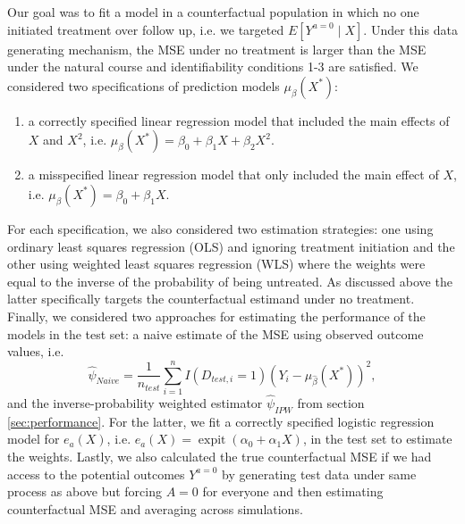 Our goal was to fit a model in a counterfactual population in which no one initiated treatment over follow up, i.e. we targeted $E[Y^{a=0} \mid X]$. Under this data generating mechanism, the MSE under no treatment is larger than the MSE under the natural course and identifiability conditions 1-3 are satisfied. We considered two specifications of prediction models $\mu_{\beta}(X^*)$:
\begin{enumerate}
    \item a correctly specified linear regression model that included the main effects of $X$ and $X^2$, i.e. $\mu_{\beta}(X^*) = \beta_0 + \beta_1 X + \beta_2 X^2$.
    \item a misspecified linear regression model that only included the main effect of $X$, i.e. $\mu_{\beta}(X^*) = \beta_0 + \beta_1 X$.
\end{enumerate} 
For each specification, we also considered two estimation strategies: one using ordinary least squares regression (OLS) and ignoring treatment initiation and the other using weighted least squares regression (WLS) where the weights were equal to the inverse of the probability of being untreated. As discussed above the latter specifically targets the counterfactual estimand under no treatment. Finally, we considered two approaches for estimating the performance of the models in the test set: a naive estimate of the MSE using observed outcome values, i.e. 
$$\widehat{\psi}_{Naive} = \frac{1}{n_{test}} \sum_{i=1}^n I(D_{test,i} = 1) (Y_i - \mu_{\widehat{\beta}}(X^*))^2,$$ 
and the inverse-probability weighted estimator $\widehat{\psi}_{IPW}$ from section \ref{sec:performance}. For the latter, we fit a correctly specified logistic regression model for $e_a(X)$, i.e. $e_a(X) = \operatorname{expit}(\alpha_0 + \alpha_1 X)$, in the test set to estimate the weights. Lastly, we also calculated the true counterfactual MSE if we had access to the potential outcomes $Y^{a=0}$ by generating test data under same process as above but forcing $A = 0$ for everyone and then estimating counterfactual MSE and averaging across simulations.

